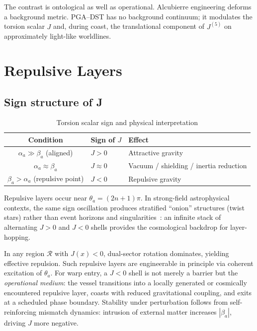 \documentclass[dvipdfmx,a4paper]{article}
\theoremstyle{definition}
\begin{document}
The contrast is ontological as well as operational. Alcubierre engineering deforms a background metric. PGA--DST has no background continuum; it modulates the torsion scalar $J$ and, during coast, the translational component of $J^{(5)}$ on approximately light-like worldlines.

\section{Repulsive Layers}
\label{sec:repulsive}

\subsection{Sign structure of J}

\begin{table}[ht]
\centering
\caption{Torsion scalar sign and physical interpretation}
\label{tab:J-signs}
\begin{tabular}{@{}cll@{}}
\toprule
Condition & Sign of $J$ & Effect \\
\midrule
$\alpha_a \gg \beta_a$ (aligned) & $J > 0$ & Attractive gravity \\
$\alpha_a \approx \beta_a$ & $J \approx 0$ & Vacuum / shielding / inertia reduction \\
$\beta_a > \alpha_a$ (repulsive point) & $J < 0$ & Repulsive gravity \\
\bottomrule
\end{tabular}
\end{table}

Repulsive layers occur near $\theta_a=(2n+1)\pi$. In strong-field astrophysical contexts, the same sign oscillation produces stratified ``onion'' structures (twist stars) rather than event horizons and singularities~\cite{dual2025}: an infinite stack of alternating $J>0$ and $J<0$ shells provides the cosmological backdrop for layer-hopping.

In any region $\mathcal{R}$ with $J(x)<0$, dual-sector rotation dominates, yielding effective repulsion. Such repulsive layers are engineerable in principle via coherent excitation of $\theta_a$. For warp entry, a $J<0$ shell is not merely a barrier but the \emph{operational medium}: the vessel transitions into a locally generated or cosmically encountered repulsive layer, coasts with reduced gravitational coupling, and exits at a scheduled phase boundary. Stability under perturbation follows from self-reinforcing mismatch dynamics: intrusion of external matter increases $|\beta_a|$, driving $J$ more negative.
\end{document}
